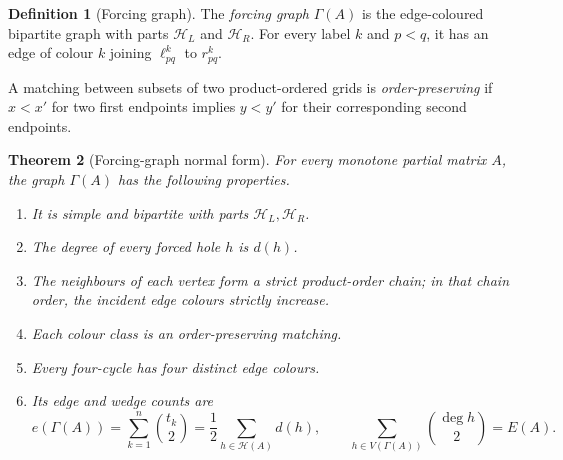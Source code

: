\documentclass[11pt]{article}
\numberwithin{equation}{section}
\newtheorem{theorem}{Theorem}[section]
\theoremstyle{definition}
\newtheorem{definition}[theorem]{Definition}
\theoremstyle{remark}
\newcommand{\Hcal}{\mathcal H}
\begin{document}
\begin{definition}[Forcing graph]
The \emph{forcing graph} $\Gamma(A)$ is the edge-coloured bipartite graph with
parts $\Hcal_L$ and $\Hcal_R$.  For every label $k$ and $p<q$, it has an edge
of colour $k$ joining $\ell^k_{pq}$ to $r^k_{pq}$.
\end{definition}

A matching between subsets of two product-ordered grids is
\emph{order-preserving} if $x<x'$ for two first endpoints implies $y<y'$ for
their corresponding second endpoints.

\begin{theorem}[Forcing-graph normal form]\label{thm:forcing-normal-form}
For every monotone partial matrix $A$, the graph $\Gamma(A)$ has the following
properties.
\begin{enumerate}[label=(\alph*)]
\item It is simple and bipartite with parts $\Hcal_L,\Hcal_R$.
\item The degree of every forced hole $h$ is $d(h)$.
\item The neighbours of each vertex form a strict product-order chain; in that
chain order, the incident edge colours strictly increase.
\item Each colour class is an order-preserving matching.
\item Every four-cycle has four distinct edge colours.
\item Its edge and wedge counts are
\begin{equation}\label{eq:edge-wedge-counts}
 e(\Gamma(A))=\sum_{k=1}^n\binom{t_k}{2}
 =\frac12\sum_{h\in\Hcal(A)}d(h),
 \qquad
 \sum_{h\in V(\Gamma(A))}\binom{\deg h}{2}=E(A).
\end{equation}
\end{enumerate}
\end{theorem}
\end{document}
